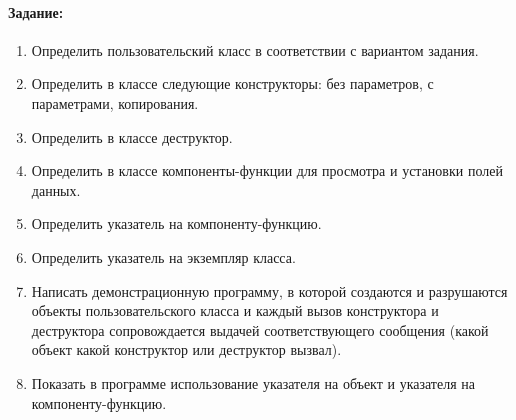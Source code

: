 \paragraph{Задание:}

\begin{enumerate}
    \small
    \item Определить пользовательский класс в соответствии с вариантом задания.
    \item Определить в классе следующие конструкторы: без параметров, с параметрами, копирования.
    \item Определить в классе деструктор.
    \item Определить в классе компоненты-функции для просмотра и установки полей данных.
    \item Определить указатель на компоненту-функцию.
    \item Определить указатель на экземпляр класса.
    \item Написать демонстрационную программу, в которой создаются и разрушаются объекты пользовательского класса и каждый вызов конструктора и деструктора сопровождается выдачей соответствующего сообщения (какой объект какой конструктор или деструктор вызвал).
    \item Показать в программе использование указателя на объект и указателя на компоненту-функцию.
\end{enumerate}







